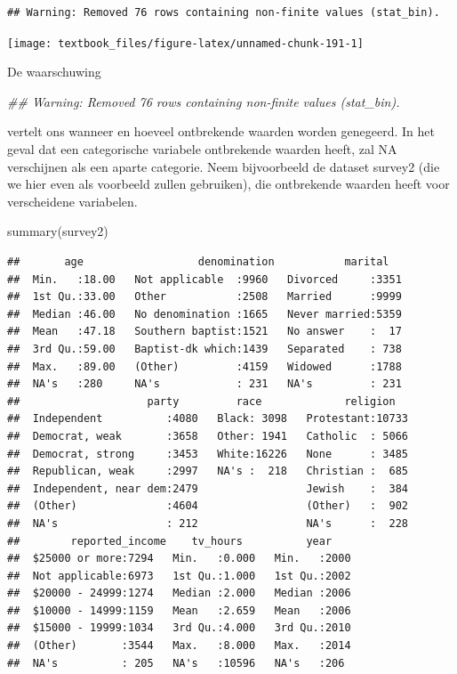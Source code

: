 \documentclass[]{tufte-book}
\newenvironment{Shaded}{}{}
\newcommand{\DocumentationTok}[1]{\textcolor[rgb]{0.73,0.13,0.13}{\textit{#1}}}
\newcommand{\FunctionTok}[1]{\textcolor[rgb]{0.02,0.16,0.49}{#1}}
\newcommand{\NormalTok}[1]{#1}
\begin{document}
\begin{verbatim}
## Warning: Removed 76 rows containing non-finite values (stat_bin).
\end{verbatim}

\texttt{[image: textbook\_files/figure-latex/unnamed-chunk-191-1]}

De waarschuwing

\begin{Shaded}
\begin{Highlighting}[]
\DocumentationTok{\#\# Warning: Removed 76 rows containing non{-}finite values (stat\_bin).}
\end{Highlighting}
\end{Shaded}

vertelt ons wanneer en hoeveel ontbrekende waarden worden genegeerd.
In het geval dat een categorische variabele ontbrekende waarden heeft, zal NA verschijnen als een aparte categorie. Neem bijvoorbeeld de dataset survey2 (die we hier even als voorbeeld zullen gebruiken), die ontbrekende waarden heeft voor verscheidene variabelen.

\begin{Shaded}
\begin{Highlighting}[]
\FunctionTok{summary}\NormalTok{(survey2)}
\end{Highlighting}
\end{Shaded}

\begin{verbatim}
##       age                  denomination           marital    
##  Min.   :18.00   Not applicable  :9960   Divorced     :3351  
##  1st Qu.:33.00   Other           :2508   Married      :9999  
##  Median :46.00   No denomination :1665   Never married:5359  
##  Mean   :47.18   Southern baptist:1521   No answer    :  17  
##  3rd Qu.:59.00   Baptist-dk which:1439   Separated    : 738  
##  Max.   :89.00   (Other)         :4159   Widowed      :1788  
##  NA's   :280     NA's            : 231   NA's         : 231  
##                    party         race             religion    
##  Independent          :4080   Black: 3098   Protestant:10733  
##  Democrat, weak       :3658   Other: 1941   Catholic  : 5066  
##  Democrat, strong     :3453   White:16226   None      : 3485  
##  Republican, weak     :2997   NA's :  218   Christian :  685  
##  Independent, near dem:2479                 Jewish    :  384  
##  (Other)              :4604                 (Other)   :  902  
##  NA's                 : 212                 NA's      :  228  
##        reported_income    tv_hours          year     
##  $25000 or more:7294   Min.   :0.000   Min.   :2000  
##  Not applicable:6973   1st Qu.:1.000   1st Qu.:2002  
##  $20000 - 24999:1274   Median :2.000   Median :2006  
##  $10000 - 14999:1159   Mean   :2.659   Mean   :2006  
##  $15000 - 19999:1034   3rd Qu.:4.000   3rd Qu.:2010  
##  (Other)       :3544   Max.   :8.000   Max.   :2014  
##  NA's          : 205   NA's   :10596   NA's   :206
\end{verbatim}
\end{document}
